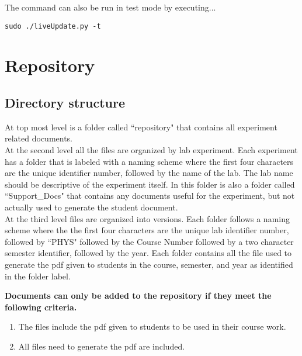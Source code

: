 \documentclass[justified]{book}
\begin{document}
\noindent The command can also be run in test mode by executing...

\begin{lstlisting}[backgroundcolor = \color{light-gray}]
sudo ./liveUpdate.py -t
\end{lstlisting}


\section{Repository}

\subsection{Directory structure}

At top most level is a folder called ``repository" that contains all experiment related documents.\\

\noindent At the second level all the files are organized by lab experiment. Each experiment has a folder that is labeled with a naming scheme where the first four characters are the unique identifier number, followed by the name of the lab. The lab name should be descriptive of the experiment itself. In this folder is also a folder called ``Support\_Docs" that contains any documents useful for the experiment, but not actually used to generate the student document. \\

\noindent At the third level files are organized into versions. Each folder follows a naming scheme where the the first four characters are the unique lab identifier number, followed by ``PHYS" followed by the Course Number followed by a two character semester identifier, followed by the year. Each folder contains all the file used to generate the pdf given to students in the course, semester, and year as identified in the folder label. \\


\vspace{12pt}
{\bf Documents can only be added to the repository if they meet the following criteria.}
\begin{enumerate}
\item The files include the pdf given to students to be used in their course work.
\item All files need to generate the pdf are included.
\end{enumerate}
\end{document}
